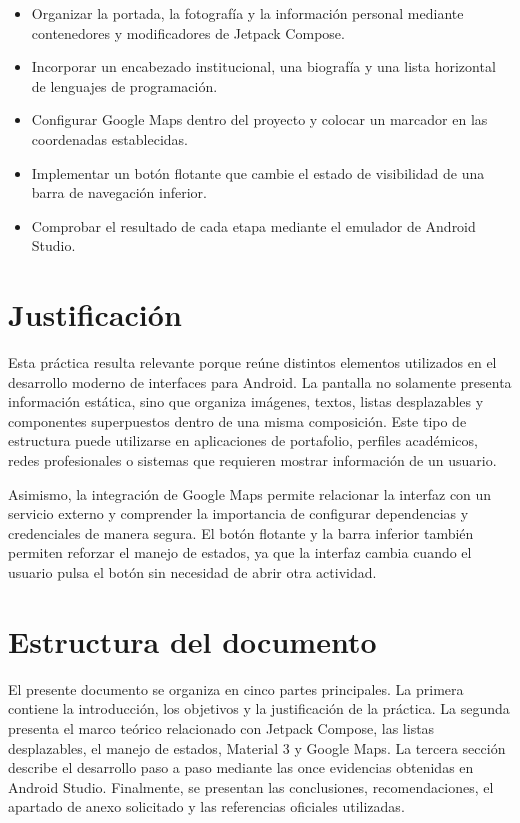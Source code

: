 \documentclass[12pt,a4paper]{article}
\begin{document}
\begin{itemize}[leftmargin=1.2cm]
  \item Organizar la portada, la fotografía y la información personal mediante contenedores y modificadores de Jetpack Compose.
  \item Incorporar un encabezado institucional, una biografía y una lista horizontal de lenguajes de programación.
  \item Configurar Google Maps dentro del proyecto y colocar un marcador en las coordenadas establecidas.
  \item Implementar un botón flotante que cambie el estado de visibilidad de una barra de navegación inferior.
  \item Comprobar el resultado de cada etapa mediante el emulador de Android Studio.
\end{itemize}

\section{Justificación}

Esta práctica resulta relevante porque reúne distintos elementos utilizados en el desarrollo moderno de interfaces para Android. La pantalla no solamente presenta información estática, sino que organiza imágenes, textos, listas desplazables y componentes superpuestos dentro de una misma composición. Este tipo de estructura puede utilizarse en aplicaciones de portafolio, perfiles académicos, redes profesionales o sistemas que requieren mostrar información de un usuario.

Asimismo, la integración de Google Maps permite relacionar la interfaz con un servicio externo y comprender la importancia de configurar dependencias y credenciales de manera segura. El botón flotante y la barra inferior también permiten reforzar el manejo de estados, ya que la interfaz cambia cuando el usuario pulsa el botón sin necesidad de abrir otra actividad.

\section{Estructura del documento}

El presente documento se organiza en cinco partes principales. La primera contiene la introducción, los objetivos y la justificación de la práctica. La segunda presenta el marco teórico relacionado con Jetpack Compose, las listas desplazables, el manejo de estados, Material 3 y Google Maps. La tercera sección describe el desarrollo paso a paso mediante las once evidencias obtenidas en Android Studio. Finalmente, se presentan las conclusiones, recomendaciones, el apartado de anexo solicitado y las referencias oficiales utilizadas.
\end{document}
